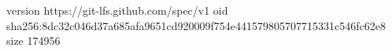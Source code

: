 version https://git-lfs.github.com/spec/v1
oid sha256:8dc32c046d37a685afa9651cd920009f754e441579805707715331c546fc62e8
size 174956
